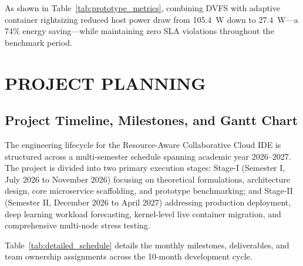\documentclass[12pt,a4paper]{report}
\begin{document}
As shown in Table~\ref{tab:prototype_metrics}, combining DVFS with adaptive container rightsizing reduced host power draw from 105.4~W down to 27.4~W---a 74\% energy saving---while maintaining zero SLA violations throughout the benchmark period.

\chapter{PROJECT PLANNING}

\section{Project Timeline, Milestones, and Gantt Chart}
The engineering lifecycle for the Resource-Aware Collaborative Cloud IDE is structured across a multi-semester schedule spanning academic year 2026--2027. The project is divided into two primary execution stages: Stage-I (Semester I, July 2026 to November 2026) focusing on theoretical formulations, architecture design, core microservice scaffolding, and prototype benchmarking; and Stage-II (Semester II, December 2026 to April 2027) addressing production deployment, deep learning workload forecasting, kernel-level live container migration, and comprehensive multi-node stress testing.

Table~\ref{tab:detailed_schedule} details the monthly milestones, deliverables, and team ownership assignments across the 10-month development cycle.
\end{document}
